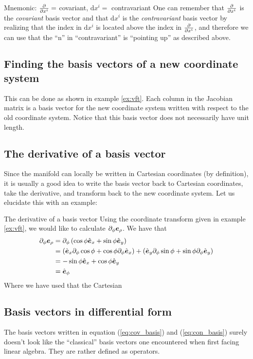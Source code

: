 \documentclass[a4paper, 12pt]{article}
\begin{document}
\vspace{0.5cm}
\begin{greenbox}{Mnemonic: $\frac{\partial {}}{\partial{x^i}} = $ covariant,  $\text{d}x^i = $ 
contravariant }
 One can remember that $\frac{\partial {}}{\partial{x^i}}$ is the \emph{covariant} basis vector 
and that $\text{d}x^i$ is the \emph{contravariant} basis vector by realizing 
that the index in $\text{d}x^i$ is located above the index in $\frac{\partial {}}{\partial{x^i}}$, 
and therefore we can use that the ``n'' in ``contravariant'' is ``pointing up'' 
as described above.
\end{greenbox}


\subsection{Finding the basis vectors of a new coordinate system}
This can be done as shown in example \ref{ex:vft}. Each column in the Jacobian 
matrix is a basis vector for the new coordinate system written with respect to 
the old coordinate system. Notice that this basis vector does not necessarily 
have unit length.


\subsection{The derivative of a basis vector}
Since the manifold can locally be written in Cartesian coordinates 
(by definition), it is usually a good idea to write the basis vector back to 
Cartesian coordinates, take the derivative, and transform back to the new 
coordinate system. Let us elucidate this with an example:

\begin{example}{The derivative of a basis vector}
 Using the coordinate transform given in example \ref{ex:vft}, we would like to 
 calculate $\partial_\phi \boldsymbol{e}_\rho$. We have that
 \begin{align*}
  \partial_\phi \boldsymbol{e}_\rho &= \partial_\phi 
\left(\cos\phi\hat{\boldsymbol{e}}_x+\sin\phi\hat{\boldsymbol{e}}_y\right)\\
    &= \left(\hat{\boldsymbol{e}}_x\partial_\phi \cos\phi + \cos\phi \partial_\phi \hat{\boldsymbol{e}}_x\right)
      +\left(\hat{\boldsymbol{e}}_y\partial_\phi \sin\phi + \sin\phi \partial_\phi \hat{\boldsymbol{e}}_y\right)\\
    &= - \sin\phi\hat{\boldsymbol{e}}_x + \cos\phi\hat{\boldsymbol{e}}_y\\
    &= \hat{\boldsymbol{e}}_\phi
 \end{align*}
 Where we have used that the Cartesian
\end{example}
%


\subsection{Basis vectors in differential form}\label{sec:bvdf}
The basis vectors written in equation (\ref{eq:cov_basis}) and 
(\ref{eq:con_basis}) surely doesn't look like the ``classical'' basis vectors 
one encountered when first facing linear algebra. They are rather defined as 
operators. 
\end{document}
